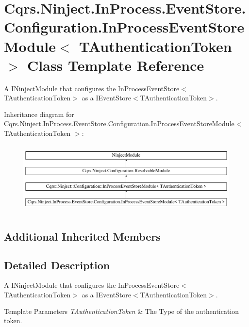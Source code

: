 \hypertarget{classCqrs_1_1Ninject_1_1InProcess_1_1EventStore_1_1Configuration_1_1InProcessEventStoreModule}{}\section{Cqrs.\+Ninject.\+In\+Process.\+Event\+Store.\+Configuration.\+In\+Process\+Event\+Store\+Module$<$ T\+Authentication\+Token $>$ Class Template Reference}
\label{classCqrs_1_1Ninject_1_1InProcess_1_1EventStore_1_1Configuration_1_1InProcessEventStoreModule}


A I\+Ninject\+Module that configures the In\+Process\+Event\+Store$<$\+T\+Authentication\+Token$>$ as a I\+Event\+Store$<$\+T\+Authentication\+Token$>$.  


Inheritance diagram for Cqrs.\+Ninject.\+In\+Process.\+Event\+Store.\+Configuration.\+In\+Process\+Event\+Store\+Module$<$ T\+Authentication\+Token $>$\+:\begin{figure}[H]
\begin{center}
\leavevmode
\includegraphics[height=3.708609cm]{classCqrs_1_1Ninject_1_1InProcess_1_1EventStore_1_1Configuration_1_1InProcessEventStoreModule}
\end{center}
\end{figure}
\subsection*{Additional Inherited Members}


\subsection{Detailed Description}
A I\+Ninject\+Module that configures the In\+Process\+Event\+Store$<$\+T\+Authentication\+Token$>$ as a I\+Event\+Store$<$\+T\+Authentication\+Token$>$. 


\begin{DoxyTemplParams}{Template Parameters}
{\em T\+Authentication\+Token} & The Type of the authentication token.\\
\hline
\end{DoxyTemplParams}
